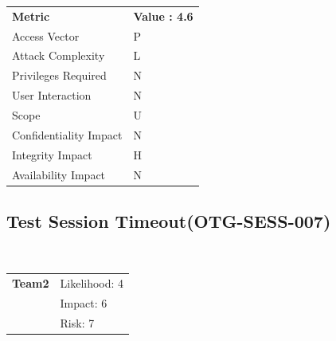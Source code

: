\documentclass[headsepline,footsepline,footinclude=false,oneside,fontsize=11pt,paper=a4,listof=totoc,bibliography=totoc]{scrbook} %
\begin{document}
\begin{center}
	\begin{tabular}{ll}
		\rowcolor[HTML]{34CDF9}
		{\color[HTML]{ECF4FF} \textbf{Metric}}        & {\color[HTML]{ECF4FF} \textbf{Value : 4.6}} \\
		\rowcolor[HTML]{BBDAFF}
		{\color[HTML]{333333} Access Vector}          & {\color[HTML]{333333} } P             \\
		\rowcolor[HTML]{ECF4FF}
		{\color[HTML]{333333} Attack Complexity}      & {\color[HTML]{333333} } L              \\
		\rowcolor[HTML]{BBDAFF}
		{\color[HTML]{333333} Privileges Required}    & {\color[HTML]{333333} } N              \\
		\rowcolor[HTML]{ECF4FF}
		{\color[HTML]{333333} User Interaction}       & {\color[HTML]{333333} } N              \\
		\rowcolor[HTML]{BBDAFF}
		{\color[HTML]{333333} Scope}                  & {\color[HTML]{333333} } U              \\
		\rowcolor[HTML]{ECF4FF}
		{\color[HTML]{333333} Confidentiality Impact} & {\color[HTML]{333333} } N              \\
		\rowcolor[HTML]{BBDAFF}
		{\color[HTML]{333333} Integrity Impact}       & {\color[HTML]{333333} } H              \\
		\rowcolor[HTML]{ECF4FF}
		{\color[HTML]{333333} Availability Impact}    & {\color[HTML]{333333} } N
	\end{tabular}
\end{center}

\pagebreak
\subsection{Test Session Timeout(OTG-SESS-007)}\

\begin{tabular}{cR{12cm}}
	\textbf{Team2} & Likelihood: 4\\& Impact: 6\\& Risk: 7
\end{tabular}
\end{document}
